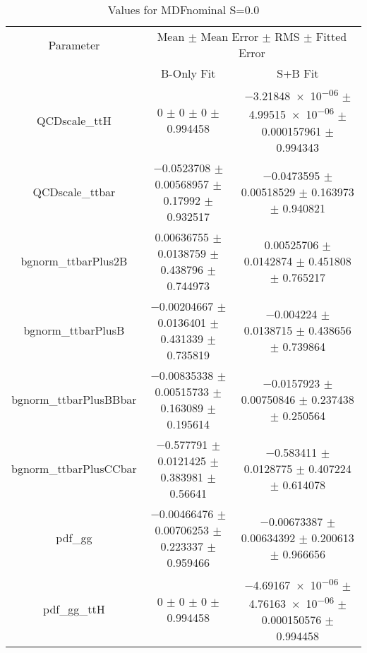 \begin{table}
\centering
\caption{Values for MDFnominal S=0.0}
\begin{tabular}{ccc}
\toprule
Parameter & \multicolumn{2}{c}{Mean $\pm$ Mean Error $\pm$ RMS $\pm$ Fitted Error}\\
 & B-Only Fit & S+B Fit\\
\midrule
QCDscale\_ttH & \num{0} $\pm$ \num{0} $\pm$ \num{0} $\pm$ \num{0.994458} & \num{-3.21848e-06} $\pm$ \num{4.99515e-06} $\pm$ \num{0.000157961} $\pm$ \num{0.994343}\\
QCDscale\_ttbar & \num{-0.0523708} $\pm$ \num{0.00568957} $\pm$ \num{0.17992} $\pm$ \num{0.932517} & \num{-0.0473595} $\pm$ \num{0.00518529} $\pm$ \num{0.163973} $\pm$ \num{0.940821}\\
bgnorm\_ttbarPlus2B & \num{0.00636755} $\pm$ \num{0.0138759} $\pm$ \num{0.438796} $\pm$ \num{0.744973} & \num{0.00525706} $\pm$ \num{0.0142874} $\pm$ \num{0.451808} $\pm$ \num{0.765217}\\
bgnorm\_ttbarPlusB & \num{-0.00204667} $\pm$ \num{0.0136401} $\pm$ \num{0.431339} $\pm$ \num{0.735819} & \num{-0.004224} $\pm$ \num{0.0138715} $\pm$ \num{0.438656} $\pm$ \num{0.739864}\\
bgnorm\_ttbarPlusBBbar & \num{-0.00835338} $\pm$ \num{0.00515733} $\pm$ \num{0.163089} $\pm$ \num{0.195614} & \num{-0.0157923} $\pm$ \num{0.00750846} $\pm$ \num{0.237438} $\pm$ \num{0.250564}\\
bgnorm\_ttbarPlusCCbar & \num{-0.577791} $\pm$ \num{0.0121425} $\pm$ \num{0.383981} $\pm$ \num{0.56641} & \num{-0.583411} $\pm$ \num{0.0128775} $\pm$ \num{0.407224} $\pm$ \num{0.614078}\\
pdf\_gg & \num{-0.00466476} $\pm$ \num{0.00706253} $\pm$ \num{0.223337} $\pm$ \num{0.959466} & \num{-0.00673387} $\pm$ \num{0.00634392} $\pm$ \num{0.200613} $\pm$ \num{0.966656}\\
pdf\_gg\_ttH & \num{0} $\pm$ \num{0} $\pm$ \num{0} $\pm$ \num{0.994458} & \num{-4.69167e-06} $\pm$ \num{4.76163e-06} $\pm$ \num{0.000150576} $\pm$ \num{0.994458}\\
\bottomrule
\end{tabular}
\end{table}